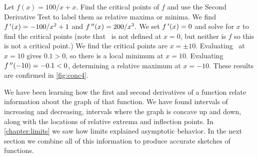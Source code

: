 \begin{example}\label{ex_conc4}%
Let $f(x)=100/x + x$.  Find the critical points of $f$ and use the Second Derivative Test to label them as relative maxima or minima.
\solution
%
%
We find $f\,'(x)=-100/x^2+1$ and $f\,''(x) = 200/x^3.$  We set $f\,'(x)=0$ and solve for $x$ to find the critical points (note that \fp\ is not defined at $x=0$, but neither is $f$ so this is not a critical point.) We find  the critical points are $x=\pm 10$.  Evaluating \fpp\ at $x=10$ gives $0.1>0$, so there is a local minimum at $x=10$.  Evaluating $f\,''(-10)=-0.1<0$, determining a relative maximum at  $x=-10$. These results are confirmed in \autoref{fig:conc4}.
\end{example}

We have been learning how the first and second derivatives of a function relate information about the graph of that function. We have found intervals of increasing and decreasing, intervals where the graph is concave up and down, along with the locations of relative extrema and inflection points. In \autoref{chapter:limits} we saw how limits explained asymptotic behavior. In the next section we combine all of this information to produce accurate sketches of functions.



